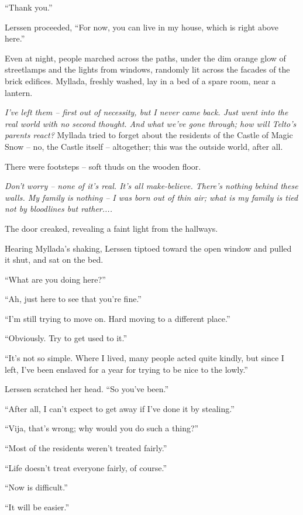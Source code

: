 ``Thank you.''

Lerssen proceeded, ``For now, you can live in my house, which is right above here.''

\centeredstars

Even at night, people marched across the paths, under the dim orange glow of streetlamps and the lights from windows, randomly lit across the facades of the brick edifices. Myllada, freshly washed, lay in a bed of a spare room, near a lantern.

\emph{I've left them -- first out of necessity, but I never came back. Just went into the real world with no second thought. And what we've gone through; how will Telto's parents react?} Myllada tried to forget about the residents of the Castle of Magic Snow -- no, the Castle itself -- altogether; this was the outside world, after all.

There were footsteps -- soft thuds on the wooden floor.

\emph{Don't worry -- none of it's real. It's all make-believe. There's nothing behind these walls. My family is nothing -- I was born out of thin air; what is my family is tied not by bloodlines but rather....}

The door creaked, revealing a faint light from the hallways.

Hearing Myllada's shaking, Lerssen tiptoed toward the open window and pulled it shut, and sat on the bed.

``What are you doing here?''

``Ah, just here to see that you're fine.''

``I'm still trying to move on. Hard moving to a different place.''

``Obviously. Try to get used to it.''

``It's not so simple. Where I lived, many people acted quite kindly, but since I left, I've been enslaved for a year for trying to be nice to the lowly.''

Lerssen scratched her head. ``So you've been.''

``After all, I can't expect to get away if I've done it by stealing.''

``Vija, that's wrong; why would you do such a thing?''

``Most of the residents weren't treated fairly.''

``Life doesn't treat everyone fairly, of course.''

``Now is difficult.''

``It will be easier.''

